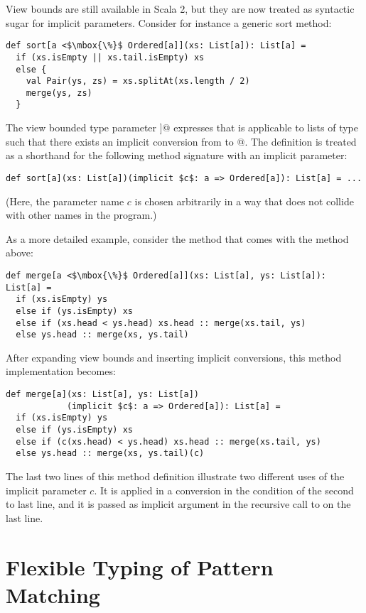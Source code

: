 \documentclass[a4paper,11pt,twoside]{article}
\begin{document}
View bounds are still available in Scala 2, but they are now treated as
syntactic sugar for implicit parameters. Consider for instance 
a generic sort method:
\begin{lstlisting}
def sort[a <$\mbox{\%}$ Ordered[a]](xs: List[a]): List[a] = 
  if (xs.isEmpty || xs.tail.isEmpty) xs
  else {
    val Pair(ys, zs) = xs.splitAt(xs.length / 2)
    merge(ys, zs)
  }
\end{lstlisting}
The view bounded type parameter \lstinline@[a <$\mbox{\%}$ Ordered[a]]@
expresses that \lstinline@sort@ is applicable to lists of type
\lstinline@a@ such that there exists an implicit conversion from
\lstinline@a@ to \lstinline@Ordered[a]@. The definition is treated as
a shorthand for the following method signature with an implicit
parameter:
\begin{lstlisting}
def sort[a](xs: List[a])(implicit $c$: a => Ordered[a]): List[a] = ...
\end{lstlisting}
(Here, the parameter name $c$ is chosen arbitrarily in a way
that does not collide with other names in the program.)

As a more detailed example, consider the \lstinline@merge@ method that
comes with the \lstinline@sort@ method above:
\begin{lstlisting}
def merge[a <$\mbox{\%}$ Ordered[a]](xs: List[a], ys: List[a]): List[a] =
  if (xs.isEmpty) ys
  else if (ys.isEmpty) xs
  else if (xs.head < ys.head) xs.head :: merge(xs.tail, ys)
  else ys.head :: merge(xs, ys.tail)
\end{lstlisting}
After expanding view bounds and inserting implicit conversions, this
method implementation becomes:
\begin{lstlisting}
def merge[a](xs: List[a], ys: List[a])
            (implicit $c$: a => Ordered[a]): List[a] =
  if (xs.isEmpty) ys
  else if (ys.isEmpty) xs
  else if (c(xs.head) < ys.head) xs.head :: merge(xs.tail, ys)
  else ys.head :: merge(xs, ys.tail)(c)
\end{lstlisting}
The last two lines of this method definition illustrate two different
uses of the implicit parameter $c$. It is applied in a conversion in
the condition of the second to last line, and it is passed as implicit
argument in the recursive call to \lstinline@merge@ on the last line.

\section{Flexible Typing of Pattern Matching}\label{gadts}
\end{document}
